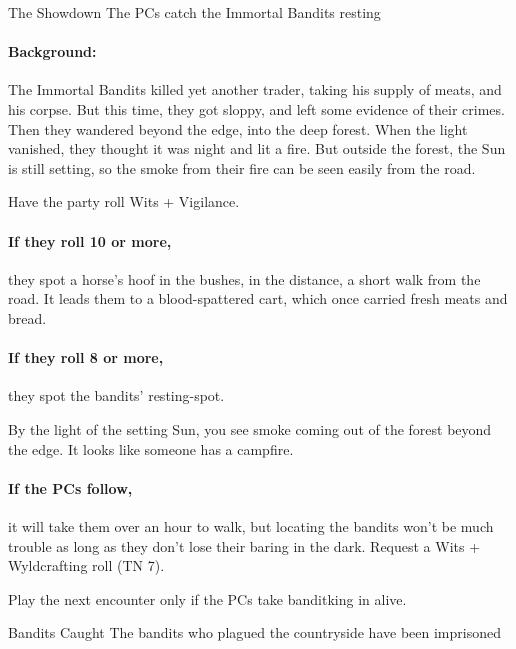 \begin{multicols}{2}
{The Showdown}%
{The PCs catch the Immortal Bandits resting}%

\paragraph{Background:}
The Immortal Bandits killed yet another trader, taking his supply of meats, and his corpse.
But this time, they got sloppy, and left some evidence of their crimes.
Then they wandered beyond the \gls{edge}, into the deep forest.
When the light vanished, they thought it was night and lit a fire.
But outside the forest, the Sun is still setting, so the smoke from their fire can be seen easily from the road.

Have the party roll Wits + Vigilance.

\paragraph{If they roll 10 or more,}
they spot a horse's hoof in the bushes, in the distance, a short walk from the road.
It leads them to a blood-spattered cart, which once carried fresh meats and bread.

\paragraph{If they roll 8 or more,}
they spot the bandits' resting-spot.

\begin{boxtext}
  By the light of the setting Sun, you see smoke coming out of the forest beyond the \gls{edge}.
  It looks like someone has a campfire.
\end{boxtext}

\paragraph{If the PCs follow,}
it will take them over an hour to walk, but locating the bandits won't be much trouble as long as they don't lose their baring in the dark.
Request a Wits + Wyldcrafting roll (TN 7).


\banditking

Play the next encounter only if the PCs take \gls{banditking} in alive.

\resumecontents[Town]

{Bandits Caught}%
{The bandits who plagued the countryside have been imprisoned}%


\end{multicols}
